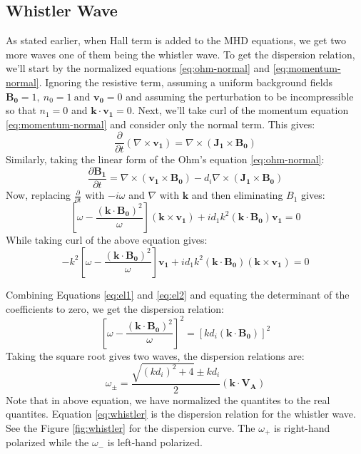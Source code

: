\documentclass[12pt]{article}
\newenvironment{changemargin}[2]{
\begin{list}{}{
\setlength{\topsep}{0pt}
\setlength{\leftmargin}{#1}
\setlength{\rightmargin}{#2}
\setlength{\listparindent}{\parindent}
\setlength{\itemindent}{\parindent}
\setlength{\parsep}{\parskip}
}
\item[]}{\end{list}}
\begin{document}
\begin{changemargin}{-2cm}{-2cm}
    \subsection{Whistler Wave}
    As stated earlier, when Hall term is added to the MHD equations, we get two more waves one of them being the whistler wave. To get the dispersion relation, we'll start by the normalized equations \ref{eq:ohm-normal} and \ref{eq:momentum-normal}. Ignoring the resistive term, assuming a uniform background fields $\mathbf{B_0} = 1, \: n_0 = 1 \: \text{and } \mathbf{v_0} = 0$ and assuming the perturbation to be incompressible so that $n_1=0$ and $\mathbf{k \cdot v_1} = 0$. Next, we'll take curl of the momentum equation \ref{eq:momentum-normal} and consider only the normal term. This gives:
    \begin{equation}
        \frac{\partial}{\partial t}(\nabla \times \mathbf{v_1}) = \nabla \times (\mathbf{J_1\times B_0})
    \end{equation}
    Similarly, taking the linear form of the Ohm's equation \ref{eq:ohm-normal}:
    \begin{equation}
        \frac{\partial \mathbf{B_1}}{\partial t} = \nabla \times \left(\mathbf{v_1\times B_0}\right)-d_i\nabla \times \left(\mathbf{J_1\times B_0}\right)
    \end{equation}
    Now, replacing $\frac{\partial}{\partial t}$ with $-i\omega$ and $\nabla$ with $\mathbf{k}$ and then eliminating $B_1$ gives:
    \begin{equation}\label{eq:el1}
        \left[\omega - \frac{(\mathbf{k \cdot B_0})^2}{\omega} \right](\mathbf{k \times v_1}) + id_1k^2(\mathbf{k \cdot B_0})\mathbf{v_1} = 0
    \end{equation}
    While taking curl of the above equation gives:
    \begin{equation}\label{eq:el2}
        -k^2\left[\omega - \frac{(\mathbf{k \cdot B_0})^2}{\omega} \right]\mathbf{v_1} + id_1k^2(\mathbf{k \cdot B_0})(\mathbf{k \times v_1}) = 0
    \end{equation}

    Combining Equations \ref{eq:el1} and \ref{eq:el2} and equating the determinant of the coefficients to zero, we get the dispersion relation:
    \begin{equation}
        \left[\omega - \frac{(\mathbf{k \cdot B_0})^2}{\omega} \right]^2 = \left[kd_i(\mathbf{k \cdot B_0})\right]^2
    \end{equation}
    Taking the square root gives two waves, the dispersion relations are:
    \begin{equation}\label{eq:whistler}
        \omega_{\pm} = \frac{\sqrt{(kd_i)^2+4}\pm kd_i}{2}(\mathbf{k \cdot V_A})
    \end{equation}
    Note that in above equation, we have normalized the quantites to the real quantites. Equation \ref{eq:whistler} is the dispersion relation for the whistler wave. See the Figure \ref{fig:whistler} for the dispersion curve. The $\omega_+$ is right-hand polarized while the $\omega_-$ is left-hand polarized.


\end{changemargin}
\end{document}
